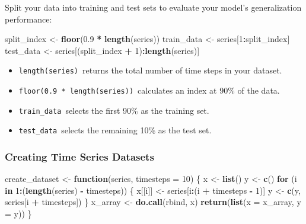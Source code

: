 \documentclass[
]{article}
\newenvironment{Shaded}{\begin{snugshade}}{\end{snugshade}}
\newcommand{\AttributeTok}[1]{\textcolor[rgb]{0.13,0.29,0.53}{#1}}
\newcommand{\ControlFlowTok}[1]{\textcolor[rgb]{0.13,0.29,0.53}{\textbf{#1}}}
\newcommand{\DecValTok}[1]{\textcolor[rgb]{0.00,0.00,0.81}{#1}}
\newcommand{\FloatTok}[1]{\textcolor[rgb]{0.00,0.00,0.81}{#1}}
\newcommand{\FunctionTok}[1]{\textcolor[rgb]{0.13,0.29,0.53}{\textbf{#1}}}
\newcommand{\NormalTok}[1]{#1}
\newcommand{\OtherTok}[1]{\textcolor[rgb]{0.56,0.35,0.01}{#1}}
\newcommand{\SpecialCharTok}[1]{\textcolor[rgb]{0.81,0.36,0.00}{\textbf{#1}}}
\begin{document}
Split your data into training and test sets to evaluate your model's
generalization performance:

\begin{Shaded}
\begin{Highlighting}[]
\NormalTok{split\_index }\OtherTok{\textless{}{-}} \FunctionTok{floor}\NormalTok{(}\FloatTok{0.9} \SpecialCharTok{*} \FunctionTok{length}\NormalTok{(series))}
\NormalTok{train\_data }\OtherTok{\textless{}{-}}\NormalTok{ series[}\DecValTok{1}\SpecialCharTok{:}\NormalTok{split\_index]}
\NormalTok{test\_data }\OtherTok{\textless{}{-}}\NormalTok{ series[(split\_index }\SpecialCharTok{+} \DecValTok{1}\NormalTok{)}\SpecialCharTok{:}\FunctionTok{length}\NormalTok{(series)]}
\end{Highlighting}
\end{Shaded}

\begin{itemize}
\item
  \texttt{length(series)}~returns the total number of time steps in your
  dataset.
\item
  \texttt{floor(0.9\ *\ length(series))}~calculates an index at 90\% of
  the data.
\item
  \texttt{train\_data}~selects the first 90\% as the training set.
\item
  \texttt{test\_data}~selects the remaining 10\% as the test set.
\end{itemize}

\subsubsection{Creating Time Series
Datasets}\label{creating-time-series-datasets}

\begin{Shaded}
\begin{Highlighting}[]
\NormalTok{create\_dataset }\OtherTok{\textless{}{-}} \ControlFlowTok{function}\NormalTok{(series, }\AttributeTok{timesteps =} \DecValTok{10}\NormalTok{) \{}
\NormalTok{  x }\OtherTok{\textless{}{-}} \FunctionTok{list}\NormalTok{()}
\NormalTok{  y }\OtherTok{\textless{}{-}} \FunctionTok{c}\NormalTok{()}
  \ControlFlowTok{for}\NormalTok{ (i }\ControlFlowTok{in} \DecValTok{1}\SpecialCharTok{:}\NormalTok{(}\FunctionTok{length}\NormalTok{(series) }\SpecialCharTok{{-}}\NormalTok{ timesteps)) \{}
\NormalTok{    x[[i]] }\OtherTok{\textless{}{-}}\NormalTok{ series[i}\SpecialCharTok{:}\NormalTok{(i }\SpecialCharTok{+}\NormalTok{ timesteps }\SpecialCharTok{{-}} \DecValTok{1}\NormalTok{)]}
\NormalTok{    y }\OtherTok{\textless{}{-}} \FunctionTok{c}\NormalTok{(y, series[i }\SpecialCharTok{+}\NormalTok{ timesteps])}
\NormalTok{  \}}
\NormalTok{  x\_array }\OtherTok{\textless{}{-}} \FunctionTok{do.call}\NormalTok{(rbind, x)}
  \FunctionTok{return}\NormalTok{(}\FunctionTok{list}\NormalTok{(}\AttributeTok{x =}\NormalTok{ x\_array, }\AttributeTok{y =}\NormalTok{ y))}
\NormalTok{\}}
\end{Highlighting}
\end{Shaded}
\end{document}

